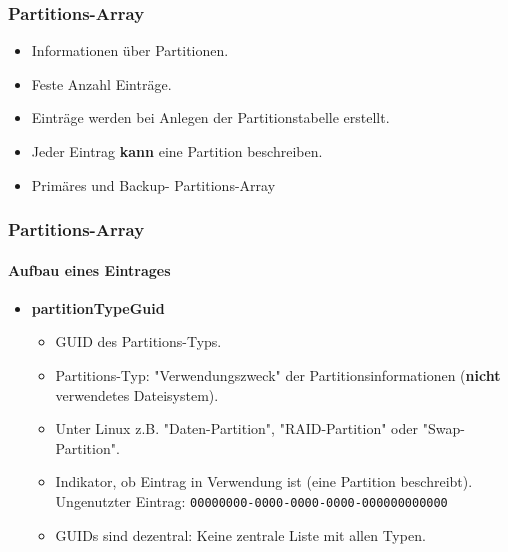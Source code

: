 \begin{frame}
    \frametitle{Partitions-Array}

    \begin{itemize}
        \item Informationen über Partitionen.
        \item Feste Anzahl Einträge. 
        \item Einträge werden bei Anlegen der Partitionstabelle erstellt.
        \item Jeder Eintrag \textbf{kann} eine Partition beschreiben.
        \item Primäres und Backup- Partitions-Array
    \end{itemize}
\end{frame}

\begin{frame}
    \frametitle{Partitions-Array}
    \framesubtitle{Aufbau eines Eintrages}

    \begin{itemize}
        \item \textbf{partitionTypeGuid}
        \begin{itemize}
            \item GUID des Partitions-Typs.
            \item Partitions-Typ: "Verwendungszweck" der Partitionsinformationen (\textbf{nicht} verwendetes Dateisystem).
            \item Unter Linux z.B. "Daten-Partition", "RAID-Partition" oder "Swap-Partition".
            \item Indikator, ob Eintrag in Verwendung ist (eine Partition beschreibt). 
            \\Ungenutzter Eintrag: \texttt{00000000-0000-0000-0000-000000000000}
            \item GUIDs sind dezentral: Keine zentrale Liste mit allen Typen.
        \end{itemize}
    \end{itemize}
\end{frame}

